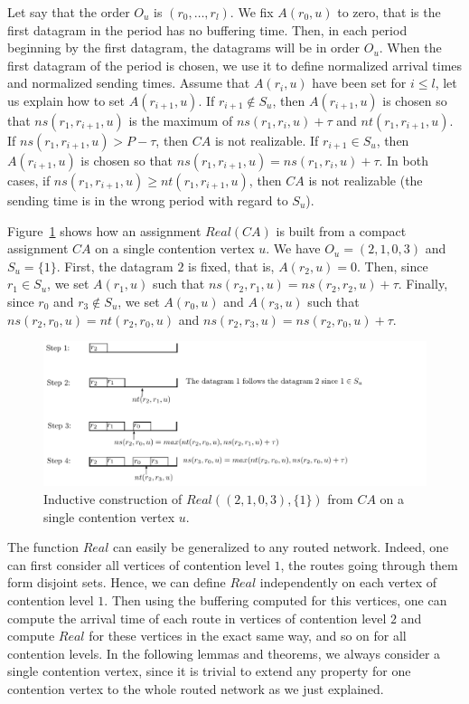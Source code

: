 \documentclass[english]{article}
\begin{document}
Let say that the order $O_u$ is $(r_0, \dots, r_l)$. We fix $A(r_0,u)$ to zero, that is the first
datagram in the period has no buffering time. Then, in each period beginning by the first datagram, the datagrams will be in order $O_u$. When the first datagram of the period is chosen, we use it to define normalized arrival times and normalized sending times.
Assume that $A(r_i,u)$ have been set for $i \leq l$, let us explain how to 
set $A(r_{i+1},u)$. If $r_{i+1} \notin S_u$, then $A(r_{i+1},u)$ is chosen so that $ns(r_1,r_{i+1},u)$ is the maximum of $ns(r_1,r_i,u) + \tau$ and $nt(r_1,r_{i+1},u)$. If $ns(r_1,r_{i+1},u) > P - \tau$, then $CA$ is not realizable. If $r_{i+1} \in S_u$, then $A(r_{i+1},u)$ is chosen so that $ns(r_1, r_{i+1},u) = ns(r_1,r_i,u) + \tau$. In both cases, if $ns(r_1, r_{i+1},u) \geq nt(r_1,r_{i+1},u)$, then $CA$ is not realizable (the sending time is in the wrong period with regard to $S_u$). 

Figure~\ref{fig:compacttoassignment} shows how an assignment $Real(CA)$ is built from a compact assignment $CA$ on a single contention vertex $u$. We have $O_u = (2,1,0,3)$ and $S_u = \{1\}$. First, the datagram $2$ is fixed, that is, $A(r_2,u)=0$. Then, since $r_1 \in S_u$, we set $A(r_1,u)$ such that $ ns(r_2,r_1,u) = ns(r_2,r_2,u) + \tau$. 
Finally, since $r_0$ and $r_3 \notin S_u$, we set $A(r_0,u)$ and $A(r_3,u)$ such that $ns(r_2,r_0,u) = nt(r_2,r_0,u)$ and  $ns(r_2,r_3,u) = ns(r_2,r_0,u) + \tau$.
\begin{figure}[!h]
	\centering
	\includegraphics[scale=1]{compacttoassignment}
\caption{Inductive construction of $Real((2,1,0,3),\{1\})$ from $CA$ on a single contention vertex $u$. }
\label{fig:compacttoassignment} 
\end{figure}

The function $Real$ can easily be generalized to any routed network. Indeed, one can first consider all vertices of contention level $1$, the routes going through them form disjoint sets. Hence, we can define $Real$ independently on each vertex of contention level $1$. 
Then using the buffering computed for this vertices, one can compute the arrival time of each route in vertices of contention level $2$ and compute $Real$ for these vertices in the exact same way, and so on for all contention levels. In the following lemmas and theorems, we always consider a single contention vertex, since it is trivial to extend any property for one contention vertex to the whole routed network as we just explained. 
\end{document}
